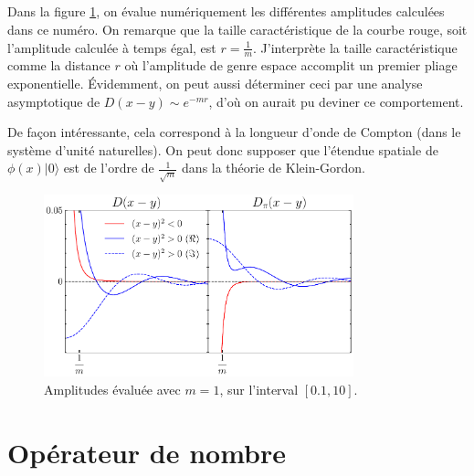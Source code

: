 \documentclass{article}
\numberwithin{equation}{section}
\begin{document}
\subsection{}

Dans la figure \ref{fig:amplitudes}, on évalue numériquement les différentes amplitudes calculées dans ce numéro. On remarque 
que la taille caractéristique de la courbe rouge, soit l'amplitude calculée à temps égal, est $r = \frac{1}{m}$. 
J'interprète la taille caractéristique comme la distance $r$ où l'amplitude de genre espace accomplit un premier pliage exponentielle.
Évidemment, on peut aussi déterminer ceci par une analyse asymptotique de $D(x - y) \sim e^{-mr}$, d'où on aurait 
pu deviner ce comportement.

De façon intéressante, cela correspond à la longueur d'onde de Compton (dans le système d'unité naturelles).
On peut donc supposer que l'étendue spatiale de $\phi(x) | 0 \rangle $ est de l'ordre de $\frac{1}{\sqrt{m}}$ dans la théorie 
de Klein-Gordon.
\begin{figure}
        \centering
        \includegraphics[width=0.8\textwidth]{amplitudes.pdf}
        \caption{Amplitudes évaluée avec $m=1$, sur l'interval $[0.1, 10]$.}
        \label{fig:amplitudes}
\end{figure}



\section{Opérateur de nombre}
\end{document}
